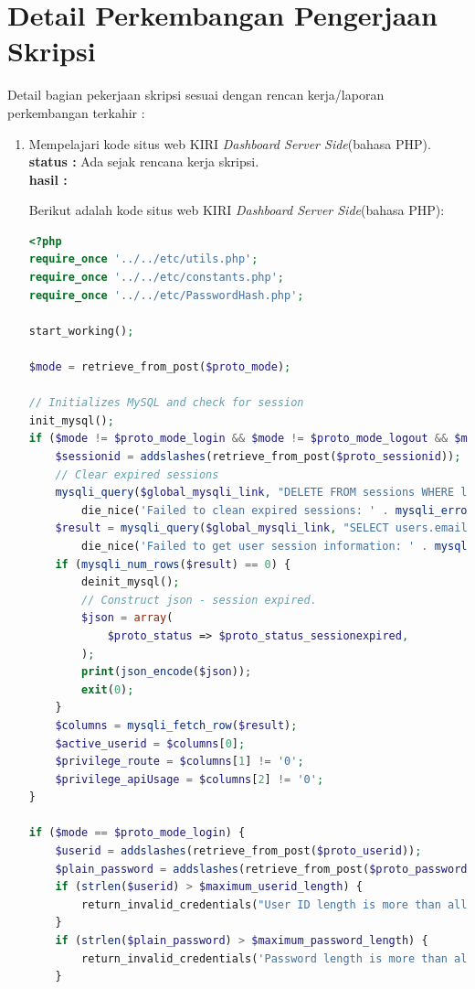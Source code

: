 \documentclass[a4paper,twoside]{article}
\begin{document}
\section{Detail Perkembangan Pengerjaan Skripsi}
Detail bagian pekerjaan skripsi sesuai dengan rencan kerja/laporan perkembangan terkahir :
	\begin{enumerate}
		\item Mempelajari kode situs web KIRI \textit{Dashboard Server Side}(bahasa PHP).\\
		{\bf status :} Ada sejak rencana kerja skripsi.\\
		{\bf hasil :}
		
		Berikut adalah kode situs web KIRI \textit{Dashboard Server Side}(bahasa PHP):
\begin{lstlisting}[language=PHP,basicstyle=\tiny,caption=handle.php,label={lst:handle.php}]
<?php
require_once '../../etc/utils.php';
require_once '../../etc/constants.php';
require_once '../../etc/PasswordHash.php';

start_working();

$mode = retrieve_from_post($proto_mode);

// Initializes MySQL and check for session
init_mysql();
if ($mode != $proto_mode_login && $mode != $proto_mode_logout && $mode != $proto_mode_register) {
	$sessionid = addslashes(retrieve_from_post($proto_sessionid));
	// Clear expired sessions
	mysqli_query($global_mysqli_link, "DELETE FROM sessions WHERE lastSeen < (NOW() - INTERVAL $session_expiry_interval_mysql)") or
		die_nice('Failed to clean expired sessions: ' . mysqli_error($global_mysqli_link), true);
	$result = mysqli_query($global_mysqli_link, "SELECT users.email, users.privilegeRoute, users.privilegeApiUsage FROM users LEFT JOIN sessions ON users.email = sessions.email WHERE sessions.sessionId = '$sessionid'") or
		die_nice('Failed to get user session information: ' . mysqli_error($global_mysqli_link), true);
	if (mysqli_num_rows($result) == 0) {
		deinit_mysql();
		// Construct json - session expired.
		$json = array(
			$proto_status => $proto_status_sessionexpired,
		);
		print(json_encode($json));
		exit(0);
	}
	$columns = mysqli_fetch_row($result);
	$active_userid = $columns[0]; 
	$privilege_route = $columns[1] != '0';
	$privilege_apiUsage = $columns[2] != '0';
}

if ($mode == $proto_mode_login) {
	$userid = addslashes(retrieve_from_post($proto_userid));
	$plain_password = addslashes(retrieve_from_post($proto_password));
	if (strlen($userid) > $maximum_userid_length) {
		return_invalid_credentials("User ID length is more than allowed (". strlen($userid) . ')');
	}
	if (strlen($plain_password) > $maximum_password_length) {
		return_invalid_credentials('Password length is more than allowed ('. strlen($password) . ')');
	}


\end{lstlisting}
\end{enumerate}
\end{document}
